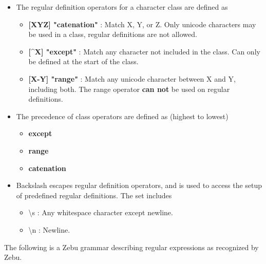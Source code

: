 \documentclass[12pt]{article}
\begin{document}
\begin{itemize}
\item The regular definition operators for a character class are defined as
  \begin{itemize}
    \item \textbf{[XYZ] "catenation"} : Match X, Y, or Z. Only unicode characters may be used in a class, regular definitions are not allowed.
    \item \textbf{[\textasciicircum X] "except"} : Match any character not included in the class. Can only be defined at the start of the class.
    \item \textbf{[X-Y] "range"}  : Match any unicode character between X and Y, including both. The range operator \textbf{can not} be used on regular definitions.
  \end{itemize}

\item The precedence of class operators are defined as (highest to lowest)
  \begin{itemize}
    \item \textbf{except}
    \item \textbf{range}
    \item \textbf{catenation}
  \end{itemize} 

\item Backslash escapes regular definition operators, and is used to access the setup of predefined regular definitions. The set includes
  \begin{itemize}
    \item \textbackslash s : Any whitespace character except newline.
    \item \textbackslash n : Newline.
  \end{itemize}

\end{itemize}

The following is a Zebu grammar describing regular expressions as recognized by Zebu.
\end{document}
